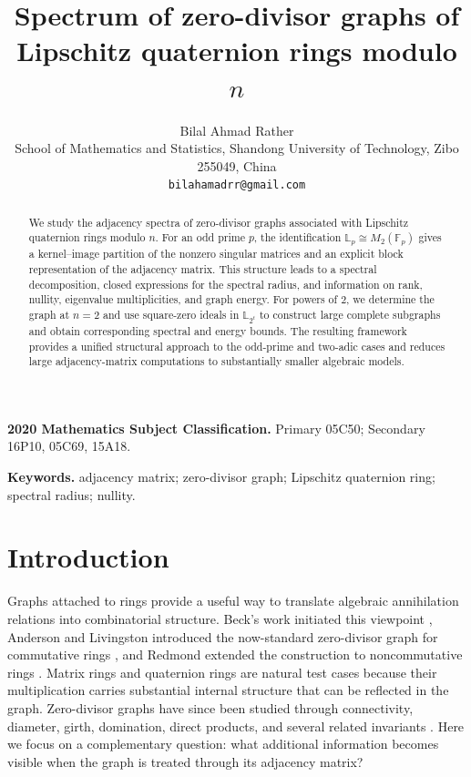 \documentclass[12pt]{article}
\title{Spectrum of zero-divisor graphs of Lipschitz quaternion rings modulo $n$}
\author{{\small Bilal Ahmad Rather}\\[2mm]
	{\small School of Mathematics and Statistics, Shandong University of Technology, Zibo 255049, China}\\
	\texttt{bilahamadrr@gmail.com}
}
\date{}
\theoremstyle{definition}
\begin{document}
	\pagestyle{myheadings} 
	\maketitle
	
	\begin{abstract}
		We study the adjacency spectra of zero-divisor graphs associated with Lipschitz quaternion rings modulo $n$. For an odd prime $p$, the identification $\mathbb{L}_p\cong M_2(\mathbb{F}_p)$ gives a kernel--image partition of the nonzero singular matrices and an explicit block representation of the adjacency matrix. This structure leads to a spectral decomposition, closed expressions for the spectral radius, and information on rank, nullity, eigenvalue multiplicities, and graph energy. For powers of $2$, we determine the graph at $n=2$ and use square-zero ideals in $\mathbb{L}_{2^t}$ to construct large complete subgraphs and obtain corresponding spectral and energy bounds. The resulting framework provides a unified structural approach to the odd-prime and two-adic cases and reduces large adjacency-matrix computations to substantially smaller algebraic models.
	\end{abstract}
	
	
	\noindent\textbf{2020 Mathematics Subject Classification.}
	Primary 05C50; Secondary 16P10, 05C69, 15A18.
	
	\noindent\textbf{Keywords.}
	adjacency matrix; zero-divisor graph; Lipschitz quaternion ring; spectral radius; nullity.
	
	\section{Introduction}
	
	Graphs attached to rings provide a useful way to translate algebraic annihilation relations into combinatorial structure. Beck's work initiated this viewpoint \cite{beck1988}, Anderson and Livingston introduced the now-standard zero-divisor graph for commutative rings \cite{anderson1999}, and Redmond extended the construction to noncommutative rings \cite{redmond2002}. Matrix rings and quaternion rings are natural test cases because their multiplication carries substantial internal structure that can be reflected in the graph.
	Zero-divisor graphs have since been studied through connectivity, diameter, girth, domination, direct products, and several related invariants \cite{akbari2006,akbari2007,axtell2006,bozic2009,miguel2013,wu2005}. Here we focus on a complementary question: what additional information becomes visible when the graph is treated through its adjacency matrix?
	
\end{document}
